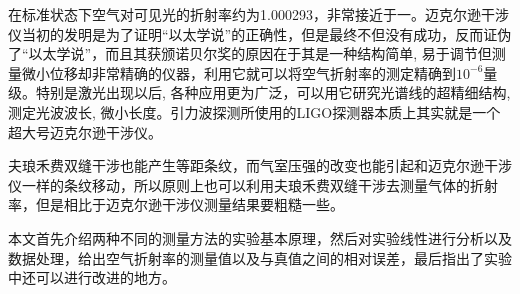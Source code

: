 \documentclass{WHUReport}
\begin{document}
\begin{multicols}{2}
	在标准状态下空气对可见光的折射率约为1.000293，非常接近于一。迈克尔逊干涉仪当初的发明是为了证明“以太学说”的正确性，但是最终不但没有成功，反而证伪了“以太学说”，而且其获颁诺贝尔奖的原因在于其是一种结构简单, 易于调节但测量微小位移却非常精确的仪器，利用它就可以将空气折射率的测定精确到$10^{-6}$量级。特别是激光出现以后, 各种应用更为广泛，可以用它研究光谱线的超精细结构, 测定光波波长, 微小长度。引力波探测所使用的LIGO探测器本质上其实就是一个超大号迈克尔逊干涉仪。
	
	夫琅禾费双缝干涉也能产生等距条纹，而气室压强的改变也能引起和迈克尔逊干涉仪一样的条纹移动，所以原则上也可以利用夫琅禾费双缝干涉去测量气体的折射率，但是相比于迈克尔逊干涉仪测量结果要粗糙一些。
	
	本文首先介绍两种不同的测量方法的实验基本原理，然后对实验线性进行分析以及数据处理，给出空气折射率的测量值以及与真值之间的相对误差，最后指出了实验中还可以进行改进的地方。

\end{multicols}
\end{document}
